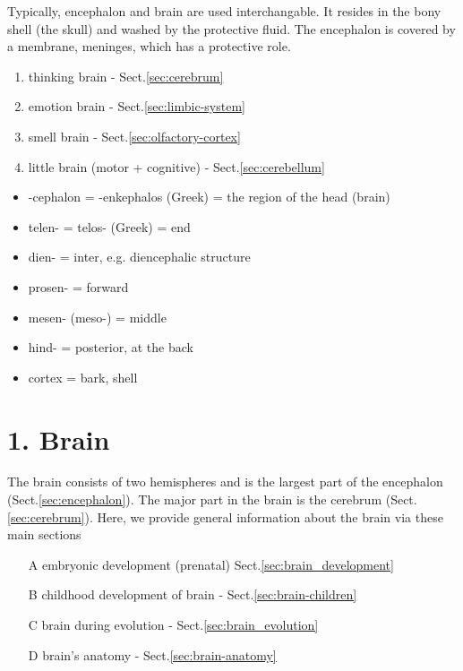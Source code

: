 Typically, encephalon and brain are used interchangable.  It resides in the bony
shell (the skull) and washed by the protective fluid.
The encephalon is covered by a membrane, meninges, which has a protective role.
\begin{enumerate}
  \item thinking brain - Sect.\ref{sec:cerebrum}
  
  \item emotion brain - Sect.\ref{sec:limbic-system}
  
  \item smell brain - Sect.\ref{sec:olfactory-cortex}
  
  \item little brain (motor + cognitive) - Sect.\ref{sec:cerebellum} 
  
\end{enumerate}

\begin{mdframed}
\begin{itemize}
  \item  -cephalon = -enkephalos (Greek) = the region of the head (brain)

  \item telen- = telos- (Greek) = end

  \item dien- = inter, e.g. diencephalic structure

  \item prosen- = forward

  \item mesen- (meso-) = middle

  \item hind- = posterior, at the back

  \item cortex = bark, shell
\end{itemize}

\end{mdframed} 


\section{1. Brain}
\label{sec:brain}

The brain consists of two hemispheres and is the largest part of the encephalon
(Sect.\ref{sec:encephalon}). The major part in the brain is the cerebrum
(Sect.\ref{sec:cerebrum}). Here, we provide general information about the brain
via these main sections
\begin{enumerate}
  \item [A] embryonic development (prenatal) Sect.\ref{sec:brain_development}
  
  \item [B] childhood development of brain - Sect.\ref{sec:brain-children}
  
  \item [C] brain during evolution - Sect.\ref{sec:brain_evolution}	
  
  \item [D] brain's anatomy - Sect.\ref{sec:brain-anatomy}
\end{enumerate}

